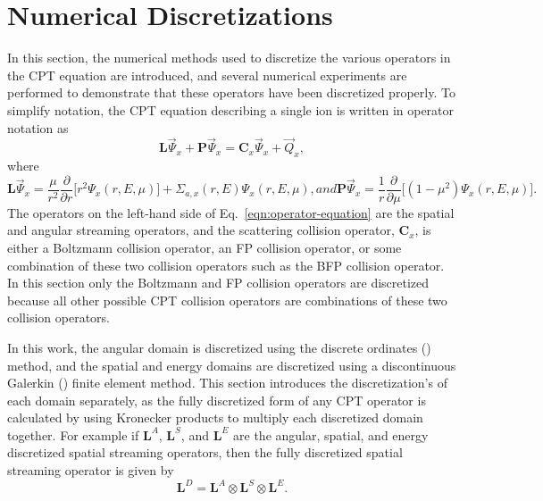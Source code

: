 \documentclass[../main.tex]{subfiles}
\begin{document}
\chapter{Numerical Discretizations}
In this section, the numerical methods used to discretize the various operators in the CPT equation are introduced, and several numerical experiments are performed to demonstrate that these operators have been discretized properly. To simplify notation, the CPT equation describing a single ion is written in operator notation as
\begin{equation} \label{eqn:operator-equation}
    \boldsymbol{L} \vec{\Psi}_x + \boldsymbol{P} \vec{\Psi}_x = \boldsymbol{C}_{x} \vec{\Psi}_x + \vec{Q}_x,
\end{equation}
where
\begin{subequations}
    \begin{equation}
        \boldsymbol{L} \vec{\Psi}_x = \dfrac{\mu}{r^2} \dfrac{\partial}{\partial r}\Big[ r^2 \Psi_x(r,E,\mu)\Big] + \Sigma_{a,x}(r,E) \Psi_x(r,E,\mu),
    \end{equation}
    and
    \begin{equation}
        \boldsymbol{P} \vec{\Psi}_x = \dfrac{1}{r} \dfrac{\partial}{\partial \mu}\Big[ (1-\mu^2) \Psi_x(r,E,\mu)\Big].
    \end{equation}
\end{subequations}
The operators on the left-hand side of Eq.~\eqref{eqn:operator-equation} are the spatial and angular streaming operators, and the scattering collision operator, $\boldsymbol{C}_{x}$, is either a Boltzmann collision operator, an FP collision operator, or some combination of these two collision operators such as the BFP collision operator. In this section only the Boltzmann and FP collision operators are discretized because all other possible CPT collision operators are combinations of these two collision operators.

In this work, the angular domain is discretized using the discrete ordinates (\Snns) method, and the spatial and energy domains are discretized using a discontinuous Galerkin (\dGns) finite element method. This section introduces the discretization's of each domain separately, as the fully discretized form of any CPT operator is calculated by using Kronecker products to multiply each discretized domain together. For example if $\boldsymbol{L}^A$, $\boldsymbol{L}^S$, and $\boldsymbol{L}^E$ are the angular, spatial, and energy discretized spatial streaming operators, then the fully discretized spatial streaming operator is given by
\begin{equation}
    \boldsymbol{L}^D = \boldsymbol{L}^A \otimes \boldsymbol{L}^S \otimes \boldsymbol{L}^E.
\end{equation}
\end{document}
